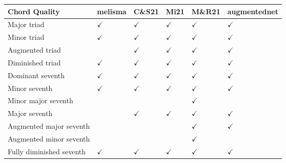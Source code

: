 \begin{tabular}{l|lllll}
Chord Quality             & \gls{melisma} & C\&S21 & Mi21 & M\&R21 & \gls{augmentednet} \\ \hline
Major triad               & $\checkmark$      & $\checkmark$                        & $\checkmark$                        & $\checkmark$                           & $\checkmark$                 \\
Minor triad               & $\checkmark$      & $\checkmark$                        & $\checkmark$                        & $\checkmark$                           & $\checkmark$                 \\
Augmented triad           &         & $\checkmark$                        & $\checkmark$                        & $\checkmark$                           & $\checkmark$                 \\
Diminished triad          & $\checkmark$      & $\checkmark$                        & $\checkmark$                        & $\checkmark$                           & $\checkmark$                 \\
Dominant seventh          & $\checkmark$      & $\checkmark$                        & $\checkmark$                        & $\checkmark$                           & $\checkmark$                 \\
Minor seventh             & $\checkmark$      & $\checkmark$                        & $\checkmark$                        & $\checkmark$                           & $\checkmark$                 \\
Minor major seventh       &         &                           &                           & $\checkmark$                           &                    \\
Major seventh             &         & $\checkmark$                        & $\checkmark$                        & $\checkmark$                           & $\checkmark$                 \\
Augmented major seventh   &         &                           &                           & $\checkmark$                           & $\checkmark$                 \\
Augmented minor seventh   &         &                           &                           & $\checkmark$                           &                    \\
Fully diminished seventh  & $\checkmark$      & $\checkmark$                        & $\checkmark$                        & $\checkmark$                           & $\checkmark$                 \\

\end{tabular}
